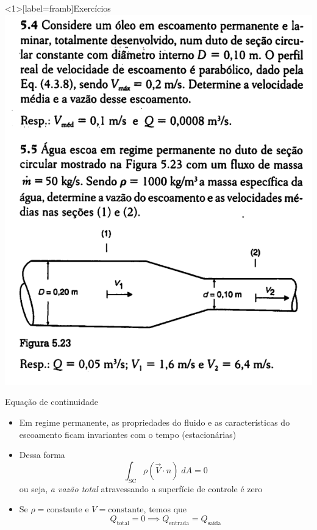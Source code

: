 \documentclass[t,%
brazilian,%
11pt,%
aspectratio=169,%
table%
]{beamer}
\begin{document}
\begin{frame}<1>[label=framb]{Exercícios}
    \includegraphics[height=\textheight-28pt]{images/Captura de tela de 2025-04-23 17-25-16.png}
\end{frame}


\begin{frame}{Equação de continuidade}
    \begin{itemize}
        \item Em regime permanente, as propriedades do fluido e as características 
            do escoamento ficam invariantes com o tempo (estacionárias)
        \item Dessa forma
            \[
                \int_\text{SC} \rho (\vec{V}\cdot\hat{n})\; dA = 0
            \]
            ou seja, \textit{a vazão total} atravessando a superfície de controle é zero
        \item Se \(\rho = \text{constante}\) e \(V = \text{constante}\), temos que
            \[
                Q_\text{total}= 0 \implies Q_\text{entrada}=Q_\text{saida}
            \]
    \end{itemize}
\end{frame}
\end{document}
